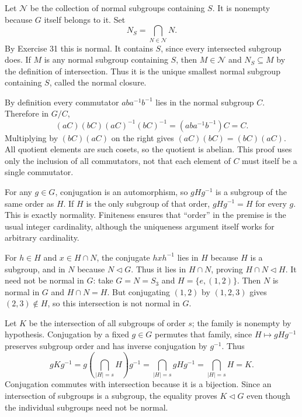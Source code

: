 Let $\mathcal N$ be the collection of normal subgroups containing $S$. It is nonempty because $G$ itself belongs to it. Set
\[N_S=\bigcap_{N\in\mathcal N}N.\]
By Exercise 31 this is normal. It contains $S$, since every intersected subgroup does. If $M$ is any normal subgroup containing $S$, then $M\in\mathcal N$ and $N_S\subseteq M$ by the definition of intersection. Thus it is the unique smallest normal subgroup containing $S$, called the normal closure.

By definition every commutator $aba^{-1}b^{-1}$ lies in the normal subgroup $C$. Therefore in $G/C$,
\[(aC)(bC)(aC)^{-1}(bC)^{-1}=(aba^{-1}b^{-1})C=C.\]
Multiplying by $(bC)(aC)$ on the right gives $(aC)(bC)=(bC)(aC)$. All quotient elements are such cosets, so the quotient is abelian. This proof uses only the inclusion of all commutators, not that each element of $C$ must itself be a single commutator.

For any $g\in G$, conjugation is an automorphism, so $gHg^{-1}$ is a subgroup of the same order as $H$. If $H$ is the only subgroup of that order, $gHg^{-1}=H$ for every $g$. This is exactly normality. Finiteness ensures that ``order'' in the premise is the usual integer cardinality, although the uniqueness argument itself works for arbitrary cardinality.

For $h\in H$ and $x\in H\cap N$, the conjugate $hxh^{-1}$ lies in $H$ because $H$ is a subgroup, and in $N$ because $N\triangleleft G$. Thus it lies in $H\cap N$, proving $H\cap N\triangleleft H$.
It need not be normal in $G$: take $G=N=S_3$ and $H=\{e,(1,2)\}$. Then $N$ is normal in $G$ and $H\cap N=H$. But conjugating $(1,2)$ by $(1,2,3)$ gives $(2,3)\notin H$, so this intersection is not normal in $G$.

Let $K$ be the intersection of all subgroups of order $s$; the family is nonempty by hypothesis. Conjugation by a fixed $g\in G$ permutes that family, since $H\mapsto gHg^{-1}$ preserves subgroup order and has inverse conjugation by $g^{-1}$. Thus
\[gKg^{-1}=g\left(\bigcap_{|H|=s}H\right)g^{-1}
=\bigcap_{|H|=s}gHg^{-1}=\bigcap_{|H|=s}H=K.\]
Conjugation commutes with intersection because it is a bijection. Since an intersection of subgroups is a subgroup, the equality proves $K\triangleleft G$ even though the individual subgroups need not be normal.

